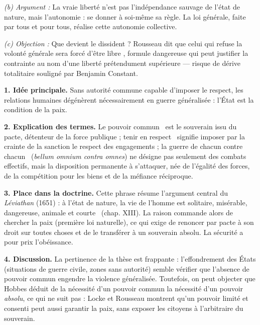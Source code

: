 \documentclass[11pt]{article}
\begin{document}
\begin{corrige}
\emph{(b) Argument :} La vraie liberté n'est pas l'indépendance sauvage de l'état de nature, mais l'autonomie : se donner à soi-même sa règle. La loi générale, faite par tous et pour tous, réalise cette autonomie collective.

\emph{(c) Objection :} Que devient le dissident ? Rousseau dit que celui qui refuse la volonté générale sera \guillemotleft forcé d'être libre \guillemotright, formule dangereuse qui peut justifier la contrainte au nom d'une liberté prétendument supérieure — risque de dérive totalitaire souligné par Benjamin Constant.

\end{corrige}

\begin{corrige}

\textbf{1. Idée principale.} Sans autorité commune capable d'imposer le respect, les relations humaines dégénèrent nécessairement en guerre généralisée : l'État est la condition de la paix.

\textbf{2. Explication des termes.} Le \guillemotleft pouvoir commun \guillemotright\ est le souverain issu du pacte, détenteur de la force publique ; \guillemotleft tenir en respect \guillemotright\ signifie imposer par la crainte de la sanction le respect des engagements ; la \guillemotleft guerre de chacun contre chacun \guillemotright\ (\emph{bellum omnium contra omnes}) ne désigne pas seulement des combats effectifs, mais la disposition permanente à s'attaquer, née de l'égalité des forces, de la compétition pour les biens et de la méfiance réciproque.

\textbf{3. Place dans la doctrine.} Cette phrase résume l'argument central du \emph{Léviathan} (1651) : à l'état de nature, la vie de l'homme est \guillemotleft solitaire, misérable, dangereuse, animale et courte \guillemotright\ (chap. XIII). La raison commande alors de chercher la paix (première loi naturelle), ce qui exige de renoncer par pacte à son droit sur toutes choses et de le transférer à un souverain absolu. La sécurité a pour prix l'obéissance.

\textbf{4. Discussion.} La pertinence de la thèse est frappante : l'effondrement des États (situations de guerre civile, zones sans autorité) semble vérifier que l'absence de pouvoir commun engendre la violence généralisée. Toutefois, on peut objecter que Hobbes déduit de la nécessité d'un pouvoir commun la nécessité d'un pouvoir \emph{absolu}, ce qui ne suit pas : Locke et Rousseau montrent qu'un pouvoir limité et consenti peut aussi garantir la paix, sans exposer les citoyens à l'arbitraire du souverain.

\end{corrige}
\end{document}
